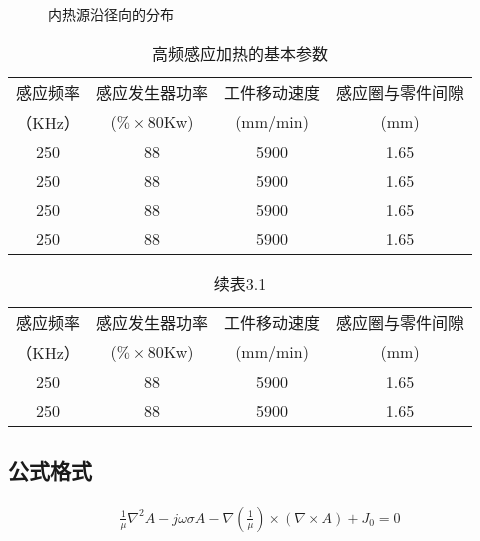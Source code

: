\documentclass[UTF8,a4paper,12pt]{ctexart}
\numberwithin{equation}{section}
\begin{document}
\begin{figure}[htb] 
\caption{内热源沿径向的分布}
\end{figure} %

\begin{table}[htbp]
\centering
\caption{高频感应加热的基本参数}
\small
\begin{tabular}{c c c c}
\toprule
感应频率 &感应发生器功率 & 工件移动速度  &感应圈与零件间隙\\
（KHz）&($\% \times$80Kw) &(mm/min)  &(mm)\\
\midrule
250 &88 &5900 &1.65\\

250 &88 &5900 &1.65\\

250 &88 &5900 &1.65\\

250 &88 &5900 &1.65\\



\bottomrule
\end{tabular}
\end{table}



\begin{table}[htbp]
\centering
\captionsetup{singlelinecheck=off}
\caption*{续表3.1}
\small
\begin{tabular}{c c c c}
\toprule
感应频率 &感应发生器功率 & 工件移动速度  &感应圈与零件间隙\\
（KHz）&($\% \times$80Kw) &(mm/min)  &(mm)\\
\midrule
250 &88 &5900 &1.65\\

250 &88 &5900 &1.65\\
\bottomrule
\end{tabular}
\end{table}
\vspace{\baselineskip}


\subsection{公式格式}


\begin{eqnarray}
\frac{1}{\mu} \nabla^2A - j \omega \sigma A -\nabla(\frac{1}{\mu}) \times(\nabla \times A)+J_0=0
\end{eqnarray}
\end{document}
